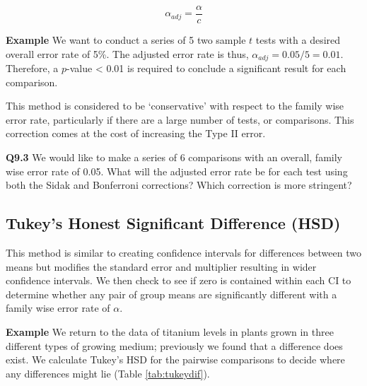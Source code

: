 \documentclass[
  oneside]{krantz}
\begin{document}
\[\alpha_{adj} = \frac{\alpha}{c}\]

\textbf{Example} We want to conduct a series of 5 two sample \(t\) tests with a desired overall error rate of 5\%. The adjusted error rate is thus, \(\alpha_{adj} = 0.05/5 = 0.01\). Therefore, a \(p\)-value \textless{} 0.01 is required to conclude a significant result for each comparison.

This method is considered to be `conservative' with respect to the family wise error rate, particularly if there are a large number of tests, or comparisons. This correction comes at the cost of increasing the Type II error.

\textbf{Q9.3} We would like to make a series of 6 comparisons with an overall, family wise error rate of 0.05. What will the adjusted error rate be for each test using both the Sidak and Bonferroni corrections? Which correction is more stringent?

\hypertarget{tukeys-honest-significant-difference-hsd}{%
\subsection{Tukey's Honest Significant Difference (HSD)}\label{tukeys-honest-significant-difference-hsd}}

This method is similar to creating confidence intervals for differences between two means but modifies the standard error and multiplier resulting in wider confidence intervals. We then check to see if zero is contained within each CI to determine whether any pair of group means are significantly different with a family wise error rate of \(\alpha\).

\textbf{Example} We return to the data of titanium levels in plants grown in three different types of growing medium; previously we found that a difference does exist. We calculate Tukey's HSD for the pairwise comparisons to decide where any differences might lie (Table \ref{tab:tukeydif}).
\end{document}
